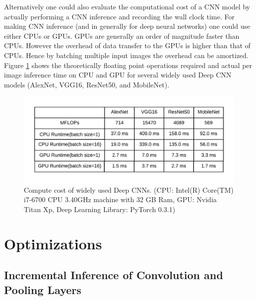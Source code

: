 \documentclass[10, sigconf]{acmart}
\begin{document}
Alternatively one could also evaluate the computational cost of a CNN model by actually performing a CNN inference and recording the wall clock time. For making CNN inference (and in generally for deep neural networks) one could use either CPUs or GPUs. GPUs are generally an order of magnitude faster than CPUs. However the overhead of data transfer to the GPUs is higher than that of CPUs. Hence by batching multiple input images the overhead can be amortized. Figure \ref{fig:compute_cost} shows the theoretically floating point operations required and actual per image inference time on CPU and GPU for several widely used Deep CNN models (AlexNet, VGG16, ResNet50, and MobileNet).

\begin{figure}
  \includegraphics[width=\columnwidth]{./images/compute_cost}
  \caption{Compute cost of widely used Deep CNNs. (CPU: Intel(R) Core(TM) i7-6700 CPU \@ 3.40GHz machine with 32 GB Ram, GPU: Nvidia Titan Xp, Deep Learning Library: PyTorch 0.3.1)}
  \label{fig:compute_cost}
\end{figure}


\section{Optimizations}

\subsection{Incremental Inference of Convolution and Pooling Layers}\label{sec:ivm}
\end{document}

